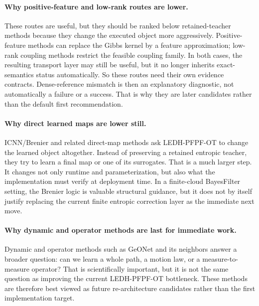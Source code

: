 \documentclass[11pt]{report}
\begin{document}
\paragraph{Why positive-feature and low-rank routes are lower.}
These routes are useful, but they should be ranked below retained-teacher methods
because they change the executed object more aggressively.  Positive-feature methods
can replace the Gibbs kernel by a feature approximation; low-rank coupling methods
restrict the feasible coupling family.  In both cases, the resulting transport layer
may still be useful, but it no longer inherits exact-semantics status automatically.
So these routes need their own evidence contracts.  Dense-reference mismatch is then an
explanatory diagnostic, not automatically a failure or a success.  That is why they are
later candidates rather than the default first recommendation.

\paragraph{Why direct learned maps are lower still.}
ICNN/Brenier and related direct-map methods ask LEDH-PFPF-OT to change the learned
object altogether.  Instead of preserving a retained entropic teacher, they try to
learn a final map or one of its surrogates.  That is a much larger step.  It changes
not only runtime and parameterization, but also what the implementation must verify at
deployment time.  In a finite-cloud BayesFilter setting, the Brenier logic is valuable
structural guidance, but it does not by itself justify replacing the current finite
entropic correction layer as the immediate next move.

\paragraph{Why dynamic and operator methods are last for immediate work.}
Dynamic and operator methods such as GeONet and its neighbors answer a broader
question: can we learn a whole path, a motion law, or a measure-to-measure operator?
That is scientifically important, but it is not the same question as improving the
current LEDH-PFPF-OT bottleneck.  These methods are therefore best viewed as future
re-architecture candidates rather than the first implementation target.
\end{document}
